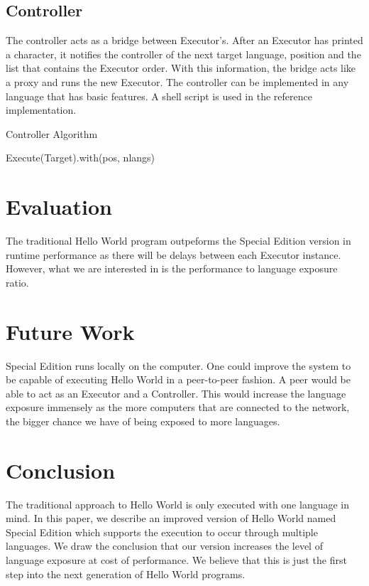 \documentclass[11pt]{article}
\begin{document}
\subsection{Controller}
The controller acts as a bridge between Executor's. After an Executor has printed a character, it notifies the controller of the next target language, position and the list that contains the Executor order. With this information, the bridge acts like a proxy and runs the new Executor. The controller can be implemented in any language that has basic features. A shell script is used in the reference implementation.
\vfill
\raggedbottom

\begin{algorithm}[H]
\caption{Controller Algorithm}
\label{Special Edition}
\begin{algorithmic}[2]
	\State Execute(Target).with(pos, nlangs)
\EndProcedure
\end{algorithmic}
\end{algorithm}

\section{Evaluation}
The traditional Hello World program outpeforms the Special Edition version in runtime performance as there will be delays between each Executor instance. However, what we are interested in is the performance to language exposure ratio.


\section{Future Work}
Special Edition runs locally on the computer. One could improve the system to be capable of executing Hello World in a peer-to-peer fashion. A peer would be able to act as an Executor and a Controller. This would increase the language exposure immensely as the more computers that are connected to the network, the bigger chance we have of being exposed to more languages.

\section{Conclusion}
The traditional approach to Hello World is only executed with one language in mind. In this paper, we describe an improved version of Hello World named Special Edition which supports the execution to occur through multiple languages. We draw the conclusion that our version increases the level of language exposure at cost of performance. We believe that this is just the first step into the next generation of Hello World programs.





\end{document}
